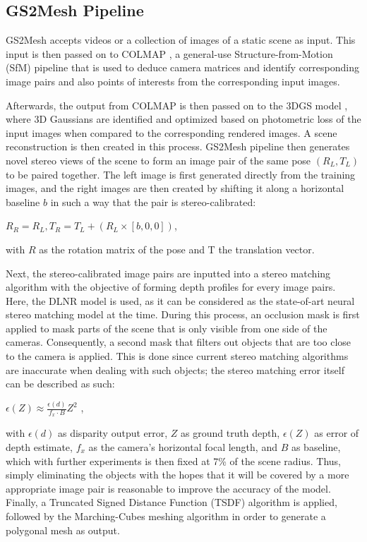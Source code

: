 \subsection{GS2Mesh Pipeline}

GS2Mesh accepts videos or a collection of images of a static scene as input. This input is then passed on to COLMAP \parencite{colmap1} \parencite{colmap2}, a general-use Structure-from-Motion (SfM) pipeline that is used to deduce camera matrices and identify corresponding image pairs and also points of interests from the corresponding input images.

Afterwards, the output from COLMAP is then passed on to the 3DGS model \parencite{3DGS}, where 3D Gaussians are identified and optimized based on photometric loss of the input images when compared to the corresponding rendered images. A scene reconstruction is then created in this process. GS2Mesh pipeline then generates novel stereo views of the scene to form an image pair of the same pose \((R_L, T_L)\) to be paired together. The left image is first generated directly from the training images, and the right images are then created by shifting it along a horizontal baseline \(b\) in such a way that the pair is stereo-calibrated:

\begin{center}
    \(R_R = R_L, T_R = T_L + (R_L \times [b, 0, 0])\),
\end{center}
with \(R\) as the rotation matrix of the pose and T the translation vector.

Next, the stereo-calibrated image pairs are inputted into a stereo matching algorithm with the objective of forming depth profiles for every image pairs. Here, the DLNR model \parencite{dlnr} is used, as it can be considered as the state-of-art neural stereo matching model at the time. During this process, an occlusion mask is first applied to mask parts of the scene that is only visible from one side of the cameras. Consequently, a second mask that filters out objects that are too close to the camera is applied. This is done since current stereo matching algorithms are inaccurate when dealing with such objects; the stereo matching error itself can be described as such:

\begin{center}
    \(\epsilon(Z) \approx \frac{\epsilon(d)}{f_x \cdot B} Z^2\) \parencite{stereo-error},
\end{center}
with \(\epsilon(d)\) as disparity output error, \(Z\) as ground truth depth, \(\epsilon(Z)\) as error of depth estimate, \(f_x\) as the camera's horizontal focal length, and \(B\) as baseline, which with further experiments is then fixed at 7\% of the scene radius. Thus, simply eliminating the objects with the hopes that it will be covered by a more appropriate image pair is reasonable to improve the accuracy of the model. Finally, a Truncated Signed Distance Function (TSDF) algorithm \parencite{tsdf} is applied, followed by the Marching-Cubes meshing algorithm \parencite{marchingcubes} in order to generate a polygonal mesh as output.


